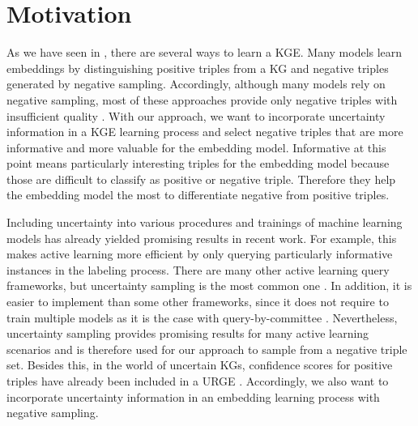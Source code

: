 \section{Motivation} 
\label{sec:motivation}


As we have seen in , there are several ways to learn a \ac{KGE}.
Many models learn embeddings by distinguishing positive triples from a \ac{KG} and negative triples generated by negative sampling.
Accordingly, although many models rely on negative sampling, most of these approaches provide only negative triples with insufficient quality \cite{qiannegative}.
With our approach, we want to incorporate uncertainty information in a \ac{KGE} learning process and select negative triples that are more informative and more valuable for the embedding model.
Informative at this point means particularly interesting triples for the embedding model because those are difficult to classify as positive or negative triple.
Therefore they help the embedding model the most to differentiate negative from positive triples.

Including uncertainty into various procedures and trainings of machine learning models has already yielded promising results in recent work.
For example, this makes active learning more efficient by only querying particularly informative instances in the labeling process.
There are many other active learning query frameworks, but uncertainty sampling is the most common one \cite{Settles2009ActiveLL}.
In addition, it is easier to implement than some other frameworks, since it does not require to train multiple models as it is the case with query-by-committee  \cite{Settles2009ActiveLL}.
Nevertheless, uncertainty sampling provides promising results for many active learning scenarios and is therefore used for our approach to sample from a negative triple set.
Besides this, in the world of uncertain \acp{KG}, confidence scores for positive triples have already been included in a \ac{URGE} \cite{UKGE}.
Accordingly, we also want to incorporate uncertainty information in an embedding learning process with negative sampling.

